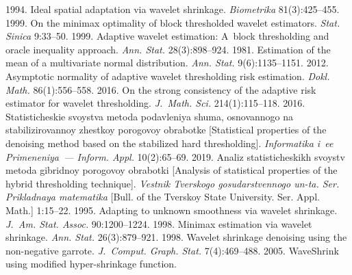   \begin{multicols}{2}

\renewcommand{\bibname}{\protect\rmfamily References}

{\small\frenchspacing
 {%
 \begin{thebibliography}{99}
1994. Ideal spatial adaptation via wavelet shrinkage. \textit{Biometrika} 81(3):425--455.
 1999. On the minimax optimality of block thresholded wavelet estimators. \textit{Stat. Sinica} 9:33--50.
 1999. Adaptive wavelet estimation: A~block thresholding and oracle inequality approach. 
\textit{Ann. Stat.} 28(3):898--924.
 1981. Estimation of the mean of a multivariate normal distribution. 
\textit{Ann. Stat.} 9(6):1135--1151.
 2012. Asymptotic normality of adaptive wavelet thresholding risk estimation. 
\textit{Dokl. Math.} 86(1):556--558.
 2016. On the strong consistency of the adaptive risk estimator for wavelet 
thresholding. \textit{J.~Math. Sci.} 214(1):115--118.
 2016. Statisticheskie svoystva metoda podavleniya shuma, osnovannogo 
na stabilizirovannoy zhest\-koy porogovoy obrabotke [Statistical properties of the denoising 
method based on the stabilized hard thresholding]. \textit{Informatika i~ee Primeneniya~--- Inform. Appl.}
 10(2):65--69.
 2019. Analiz sta\-ti\-sti\-che\-skikh svoystv metoda gibridnoy porogovoy obrabotki
  [Analysis of statistical properties of the hybrid thresholding technique]. 
  \textit{Vestnik Tverskogo gosudarstvennogo un-ta. Ser. Prikladnaya matematika}
   [Bull. of the Tverskoy State University. Ser. Appl. Math.] 1:15--22.
 1995. Adapting to unknown smoothness via wavelet shrinkage. \textit{J.~Am. Stat. Assoc.} 90:1200--1224.
 1998. Minimax estimation via wavelet shrinkage. \textit{Ann. Stat.} 26(3):879--921.
 1998. Wavelet shrinkage denoising using the non-negative garrote. 
\textit{J.~Comput. Graph. Stat.} 7(4):469--488.
 2005. WaveShrink using modified hyper-shrinkage function. 

\end{thebibliography}}}
\end{multicols}
